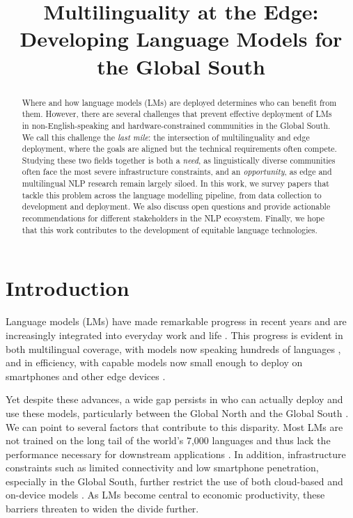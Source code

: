 \documentclass[11pt,a4paper]{article}
\title{
  Multilinguality at the Edge:\\Developing Language Models for the Global South
}
\date{}
\begin{document}
\maketitle
\begin{abstract}
  Where and how language models (LMs) are deployed determines who can benefit from them.
  However, there are several challenges that prevent effective deployment of LMs in non-English-speaking and hardware-constrained communities in the Global South.
  We call this challenge the \textit{last mile}: the intersection of multilinguality and edge deployment, where the goals are aligned but the technical requirements often compete.
  Studying these two fields together is both a \textit{need}, as linguistically diverse communities often face the most severe infrastructure constraints, and an \textit{opportunity}, as edge and multilingual NLP research remain largely siloed.
  In this work, we survey \numpapers{} papers that tackle this problem across the language modelling pipeline, from data collection to development and deployment.
  We also discuss open questions and provide actionable recommendations for different stakeholders in the NLP ecosystem.
  Finally, we hope that this work contributes to the development of equitable language technologies.
\end{abstract}

\section{Introduction}

Language models (LMs) have made remarkable progress in recent years and are increasingly integrated into everyday work and life \citep{microsoft2026aidiffusion}.
This progress is evident in both multilingual coverage, with models now speaking hundreds of languages \citep{ustun-etal-2024-aya,gemmateam2025gemma3technicalreport},
and in efficiency, with capable models now small enough to deploy on smartphones and other edge devices \citep[\textit{inter alia}]{treviso-etal-2023-efficient}.


Yet despite these advances, a wide gap persists in who can actually deploy and use these models, particularly between the Global North and the Global South \citep{joshi-etal-2020-state,khan2024ailics,pava2025mind}.
We can point to several factors that contribute to this disparity.
Most LMs are not trained on the long tail of the world's 7,000 languages and thus lack the performance necessary for downstream applications \citep{occhini2026artificialintelligencecreatingnew}.
In addition, infrastructure constraints such as limited connectivity and low smartphone penetration, especially in the Global South, further restrict the use of both cloud-based and on-device models \citep{GSMA2025MobileEconomy,itu-2025-facts}.
As LMs become central to economic productivity, these barriers threaten to widen the divide further.
\end{document}
